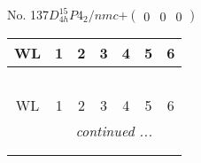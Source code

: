 \documentclass[fleqn,9pt,landscape]{jsarticle}
\begin{document}
\newpage
No. 137\quad$D_{4h}^{15}$\quad$P4_2/nmc$\quad[ tetragonal ]\quad$+\begin{pmatrix} 0 & 0 & 0 \end{pmatrix}$
\begin{center}
\renewcommand{\arraystretch}{1.2}
\begin{longtable}{ccccccc}
 \hline \hline
WL & 1 & 2 & 3 & 4 & 5 & 6 \\ \hline \endfirsthead

\multicolumn{6}{l}{\tablename\ \thetable{}} \\
 \hline \hline
WL & 1 & 2 & 3 & 4 & 5 & 6 \\ \hline \endhead

 \hline \hline
\multicolumn{6}{r}{\footnotesize\it continued ...} \\ \endfoot

 \hline \hline
\multicolumn{6}{r}{} \\ \endlastfoot


\end{longtable}
\end{center}
\end{document}
